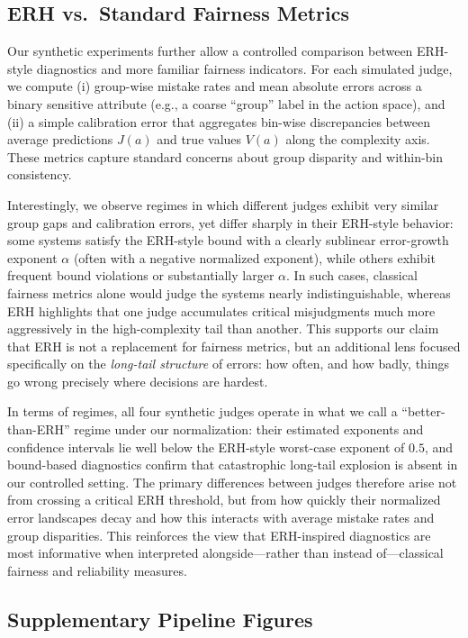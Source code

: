 \documentclass[12pt,a4paper]{article}
\theoremstyle{definition}
\theoremstyle{remark}
\begin{document}
\subsection{ERH vs.\ Standard Fairness Metrics}

Our synthetic experiments further allow a controlled comparison between ERH-style diagnostics and more familiar fairness indicators. For each simulated judge, we compute (i) group-wise mistake rates and mean absolute errors across a binary sensitive attribute (e.g., a coarse ``group'' label in the action space), and (ii) a simple calibration error that aggregates bin-wise discrepancies between average predictions $J(a)$ and true values $V(a)$ along the complexity axis. These metrics capture standard concerns about group disparity and within-bin consistency.

Interestingly, we observe regimes in which different judges exhibit very similar group gaps and calibration errors, yet differ sharply in their ERH-style behavior: some systems satisfy the ERH-style bound with a clearly sublinear error-growth exponent $\alpha$ (often with a negative normalized exponent), while others exhibit frequent bound violations or substantially larger $\alpha$. In such cases, classical fairness metrics alone would judge the systems nearly indistinguishable, whereas ERH highlights that one judge accumulates critical misjudgments much more aggressively in the high-complexity tail than another. This supports our claim that ERH is not a replacement for fairness metrics, but an additional lens focused specifically on the \emph{long-tail structure} of errors: how often, and how badly, things go wrong precisely where decisions are hardest.

In terms of regimes, all four synthetic judges operate in what we call a ``better-than-ERH'' regime under our normalization: their estimated exponents and confidence intervals lie well below the ERH-style worst-case exponent of $0.5$, and bound-based diagnostics confirm that catastrophic long-tail explosion is absent in our controlled setting. The primary differences between judges therefore arise not from crossing a critical ERH threshold, but from how quickly their normalized error landscapes decay and how this interacts with average mistake rates and group disparities. This reinforces the view that ERH-inspired diagnostics are most informative when interpreted alongside---rather than instead of---classical fairness and reliability measures.

\subsection{Supplementary Pipeline Figures}
\end{document}
